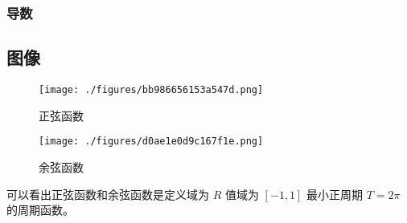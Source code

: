 \subsubsection{导数}

\subsection{图像}

\begin{figure}[ht]
\centering
\texttt{[image: ./figures/bb986656153a547d.png]}
\caption{正弦函数} \label{fig_HsTrFu_1}
\end{figure}
\begin{figure}[ht]
\centering
\texttt{[image: ./figures/d0ae1e0d9c167f1e.png]}
\caption{余弦函数} \label{fig_HsTrFu_2}
\end{figure}
可以看出正弦函数和余弦函数是定义域为 $R$ 值域为 $[-1,1]$ 最小正周期 $T = 2\pi$ 的周期函数。
